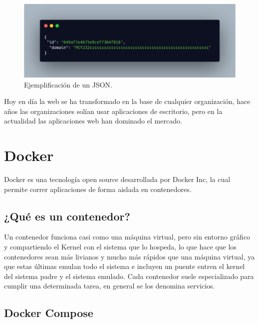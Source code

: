 \begin{figure}
    \centering
    \includegraphics[width=.5\textwidth]{imgs/json-example.png}
    \caption{Ejemplificación de un JSON.}
    \label{fig:ejemplo-json}
\end{figure}

Hoy en día la web se ha transformado en la base de cualquier organización, hace años las organizaciones solían usar aplicaciones de escritorio, pero en la actualidad las aplicaciones web han dominado el mercado.

\section{Docker}

Docker es una tecnología open source desarrollada por Docker Inc, la cual permite correr aplicaciones de forma aislada en contenedores.

\subsection{¿Qué es un contenedor?}

Un contenedor funciona casi como una máquina virtual, pero sin entorno gráfico y compartiendo el Kernel \cite{keepcoding_que_2022} con el sistema que lo hospeda, lo que hace que los contenedores sean más livianos y mucho más rápidos que una máquina virtual, ya que estas últimas emulan todo el sistema e incluyen un puente entren el kernel del sistema padre y el sistema emulado. Cada contenedor suele especializado para cumplir una determinada tarea, en general se los denomina servicios.

\subsection{Docker Compose}

